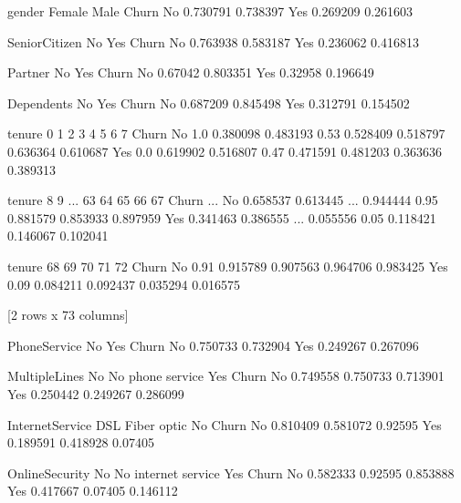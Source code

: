 \documentclass[letterpaper,10pt,english]{jupyterBook}
\begin{document}
\begin{sphinxVerbatim}[commandchars=\\\{\}]
gender    Female      Male
Churn                     
No      0.730791  0.738397
Yes     0.269209  0.261603

SeniorCitizen        No       Yes
Churn                            
No             0.763938  0.583187
Yes            0.236062  0.416813

Partner       No       Yes
Churn                     
No       0.67042  0.803351
Yes      0.32958  0.196649

Dependents        No       Yes
Churn                         
No          0.687209  0.845498
Yes         0.312791  0.154502

tenure   0         1         2     3         4         5         6         7   \PYGZbs{}
Churn                                                                           
No      1.0  0.380098  0.483193  0.53  0.528409  0.518797  0.636364  0.610687   
Yes     0.0  0.619902  0.516807  0.47  0.471591  0.481203  0.363636  0.389313   

tenure        8         9   ...        63    64        65        66        67  \PYGZbs{}
Churn                       ...                                                 
No      0.658537  0.613445  ...  0.944444  0.95  0.881579  0.853933  0.897959   
Yes     0.341463  0.386555  ...  0.055556  0.05  0.118421  0.146067  0.102041   

tenure    68        69        70        71        72  
Churn                                                 
No      0.91  0.915789  0.907563  0.964706  0.983425  
Yes     0.09  0.084211  0.092437  0.035294  0.016575  

[2 rows x 73 columns]

PhoneService        No       Yes
Churn                           
No            0.750733  0.732904
Yes           0.249267  0.267096

MultipleLines        No  No phone service       Yes
Churn                                              
No             0.749558          0.750733  0.713901
Yes            0.250442          0.249267  0.286099

InternetService       DSL  Fiber optic       No
Churn                                          
No               0.810409     0.581072  0.92595
Yes              0.189591     0.418928  0.07405

OnlineSecurity        No  No internet service       Yes
Churn                                                  
No              0.582333              0.92595  0.853888
Yes             0.417667              0.07405  0.146112


\end{sphinxVerbatim}
\end{document}
